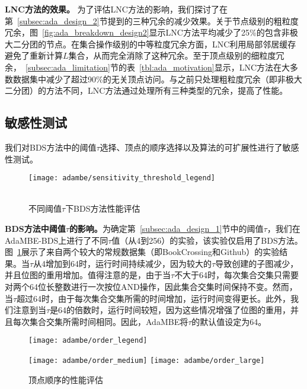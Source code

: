 \textbf{LNC方法的效果。} 为了评估LNC方法的影响，我们探讨了在第~\ref{subsec:ada_design_2}节提到的三种冗余的减少效果。关于节点级别的粗粒度冗余，图~\ref{fig:ada_breakdown_design2}显示LNC方法平均减少了25\%的包含非极大二分团的节点。在集合操作级别的中等粒度冗余方面，LNC利用局部邻居缓存避免了重新计算$L$集合，从而完全消除了这种冗余。至于顶点级别的细粒度冗余，~\ref{subsec:ada_limitation}节的表~\ref{tbl:ada_motivation}显示，LNC方法在大多数数据集中减少了超过90\%的无关顶点访问。与之前只处理粗粒度冗余（即非极大二分团）的方法不同，LNC方法通过处理所有三种类型的冗余，提高了性能。

\subsection{敏感性测试}
\label{subsec:ada_eval_sensitivity}

我们对BDS方法中的阈值$\tau$选择、顶点的顺序选择以及算法的可扩展性进行了敏感性测试。


\begin{figure} [H]
	\centering
  \texttt{[image: adambe/sensitivity\_threshold\_legend]} \\
	\\

	\caption{不同阈值$\tau$下BDS方法性能评估}
	\label{fig:ada_sensitivity_threshold}

\end{figure}

\textbf{BDS方法中阈值$\tau$的影响。}为确定第~\ref{subsec:ada_design_1}节中的阈值$\tau$，我们在AdaMBE-BDS上进行了不同$\tau$值（从4到256）的实验，该实验仅启用了BDS方法。图~\ref{fig:ada_sensitivity_threshold}展示了来自两个较大的常规数据集（即BookCrossing和Github）的实验结果。当$\tau$从4增加到64时，运行时间持续减少，因为较大的$\tau$导致创建的子图减少，并且位图的重用增加。值得注意的是，由于当$\tau$不大于64时，每次集合交集只需要对两个64位长整数进行一次按位AND操作，因此集合交集时间保持不变。然而，当$\tau$超过64时，由于每次集合交集所需的时间增加，运行时间变得更长。此外，我们注意到当$\tau$是64的倍数时，运行时间较短，因为这些情况增强了位图的重用，并且每次集合交集所需时间相同。因此，AdaMBE将$\tau$的默认值设定为64。


\begin{figure} [H]
	\centering
  \texttt{[image: adambe/order\_legend]}
  

		\texttt{[image: adambe/order\_medium]}
  \quad
		\texttt{[image: adambe/order\_large]}

	\caption{顶点顺序的性能评估}
	\label{fig:ada_order}

\end{figure}

